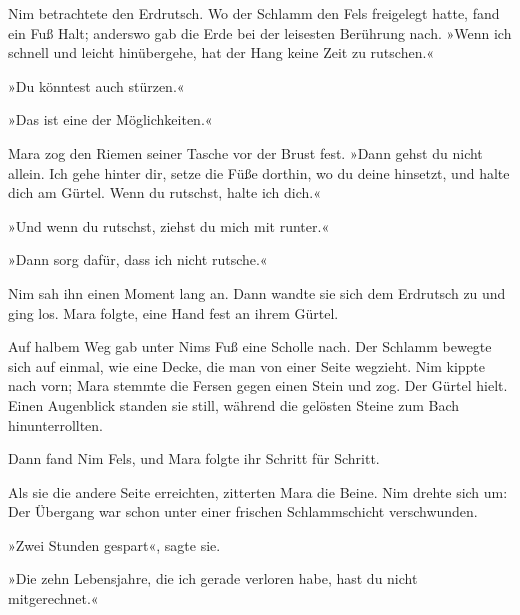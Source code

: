 \documentclass[10pt,a4paper]{article}
\begin{document}
Nim betrachtete den Erdrutsch. Wo der Schlamm den Fels freigelegt hatte, fand ein Fuß Halt; anderswo gab die Erde bei der leisesten Berührung nach. »Wenn ich schnell und leicht hinübergehe, hat der Hang keine Zeit zu rutschen.«

»Du könntest auch stürzen.«

»Das ist eine der Möglichkeiten.«

Mara zog den Riemen seiner Tasche vor der Brust fest. »Dann gehst du nicht allein. Ich gehe hinter dir, setze die Füße dorthin, wo du deine hinsetzt, und halte dich am Gürtel. Wenn du rutschst, halte ich dich.«

»Und wenn du rutschst, ziehst du mich mit runter.«

»Dann sorg dafür, dass ich nicht rutsche.«

Nim sah ihn einen Moment lang an. Dann wandte sie sich dem Erdrutsch zu und ging los. Mara folgte, eine Hand fest an ihrem Gürtel.

Auf halbem Weg gab unter Nims Fuß eine Scholle nach. Der Schlamm bewegte sich auf einmal, wie eine Decke, die man von einer Seite wegzieht. Nim kippte nach vorn; Mara stemmte die Fersen gegen einen Stein und zog. Der Gürtel hielt. Einen Augenblick standen sie still, während die gelösten Steine zum Bach hinunterrollten.

Dann fand Nim Fels, und Mara folgte ihr Schritt für Schritt.

Als sie die andere Seite erreichten, zitterten Mara die Beine. Nim drehte sich um: Der Übergang war schon unter einer frischen Schlammschicht verschwunden.

»Zwei Stunden gespart«, sagte sie.

»Die zehn Lebensjahre, die ich gerade verloren habe, hast du nicht mitgerechnet.«
\end{document}
